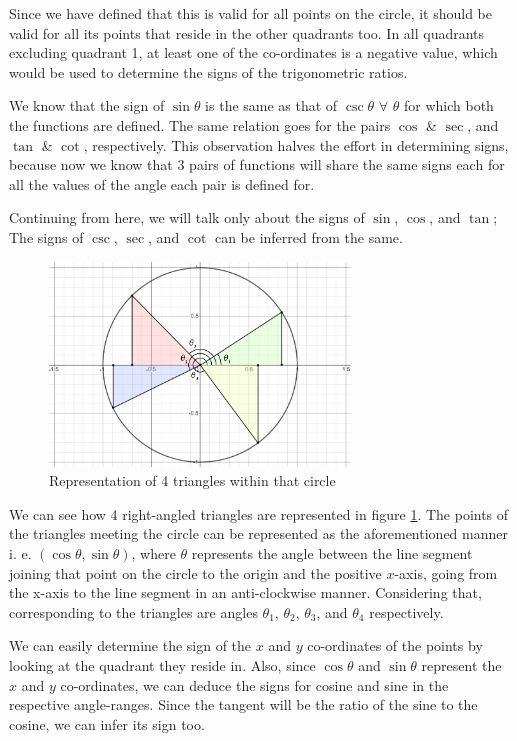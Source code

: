 \documentclass{article}
\begin{document}
Since we have defined that this is valid for all points on the circle, it should be valid for all its points that reside in the other quadrants too. In all quadrants excluding quadrant 1, at least one of the co-ordinates is a negative value, which would be used to determine the signs of the trigonometric ratios.

We know that the sign of $\sin\theta$ is the same as that of $\csc\theta$ $\forall$ $\theta$ for which both the functions are defined. The same relation goes for the pairs $\cos$ \& $\sec$, and $\tan$ \& $\cot$, respectively. This observation halves the effort in determining signs, because now we know that 3 pairs of functions will share the same signs each for all the values of the angle each pair is defined for.

Continuing from here, we will talk only about the signs of $\sin$, $\cos$, and $\tan$; The signs of $\csc$, $\sec$, and $\cot$ can be inferred from the same.

\begin{figure}[!h]
    \centering
    \includegraphics[width=8cm]{circlepoints}
    \caption{Representation of 4 triangles within that circle}
    \label{fig:circlepoints}
\end{figure}

We can see how 4 right-angled triangles are represented in figure \ref{fig:circlepoints}. The points of the triangles meeting the circle can be represented as the aforementioned manner i. e. $(\cos\theta,\sin\theta)$, where $\theta$ represents the angle between the line segment joining that point on the circle to the origin and the positive $x$-axis, going from the x-axis to the line segment in an anti-clockwise manner. Considering that, corresponding to the triangles are angles $\theta_1$, $\theta_2$, $\theta_3$, and $\theta_4$ respectively.

We can easily determine the sign of the $x$ and $y$ co-ordinates of the points by looking at the quadrant they reside in. Also, since $\cos\theta$ and $\sin\theta$ represent the $x$ and $y$ co-ordinates, we can deduce the signs for cosine and sine in the respective angle-ranges. Since the tangent will be the ratio of the sine to the cosine, we can infer its sign too.
\end{document}
